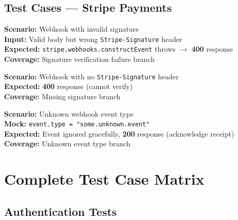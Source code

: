 \documentclass[12pt,a4paper]{report}
\newcommand{\pone}{\textbf{\color{p1red}P1}}
\newcommand{\ptwo}{\textbf{\color{p2orange}P2}}
\begin{document}
\section{Test Cases --- Stripe Payments}

\begin{tcolorbox}[criticalbox, title={PAY-001 \hfill \pone\ --- Invalid Signature}]
\textbf{Scenario:} Webhook with invalid signature \\
\textbf{Input:} Valid body but wrong \texttt{Stripe-Signature} header \\
\textbf{Expected:} \texttt{stripe.webhooks.constructEvent} throws $\to$ \textbf{400} response \\
\textbf{Coverage:} Signature verification failure branch
\end{tcolorbox}

\begin{tcolorbox}[criticalbox, title={PAY-002 \hfill \pone\ --- Missing Signature}]
\textbf{Scenario:} Webhook with no \texttt{Stripe-Signature} header \\
\textbf{Expected:} \textbf{400} response (cannot verify) \\
\textbf{Coverage:} Missing signature branch
\end{tcolorbox}

\begin{tcolorbox}[testbox, title={PAY-005 \hfill \ptwo}]
\textbf{Scenario:} Unknown webhook event type \\
\textbf{Mock:} \texttt{event.type = "some.unknown.event"} \\
\textbf{Expected:} Event ignored gracefully, \textbf{200} response (acknowledge receipt) \\
\textbf{Coverage:} Unknown event type branch
\end{tcolorbox}


\chapter{Complete Test Case Matrix}

\section{Authentication Tests}
\end{document}
